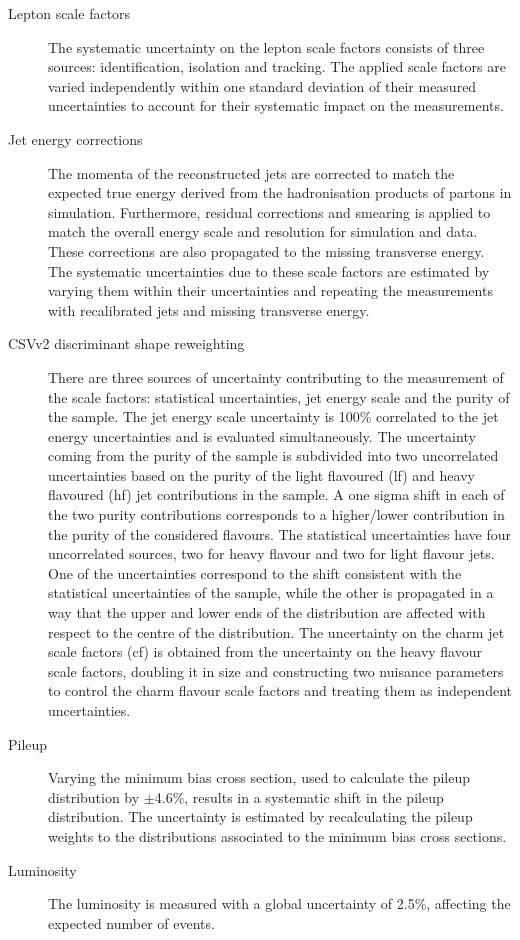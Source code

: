 \begin{description}
  		\item[Lepton scale factors] The systematic uncertainty on the lepton scale factors consists of three sources: identification, isolation and tracking.	The applied scale factors are varied independently within one standard deviation of their measured uncertainties to account for their systematic impact on the measurements. 

	\item[Jet energy corrections] The momenta of the reconstructed jets are corrected to match the expected true energy derived from the hadronisation products of partons in simulation. Furthermore, residual corrections and smearing is applied to match the overall energy scale and resolution for simulation and data. These corrections are also propagated to the missing transverse energy. The systematic uncertainties due to these scale factors are estimated by varying them within their uncertainties and repeating the measurements with recalibrated jets and missing transverse energy. 
	

	
	\item[CSVv2 discriminant shape reweighting] There are three sources of uncertainty contributing to the measurement of the scale factors: statistical uncertainties, jet energy scale and the purity of the sample. The jet energy scale uncertainty is 100\% correlated to the jet energy uncertainties and is evaluated simultaneously. The uncertainty coming from the purity of the sample is subdivided into two uncorrelated uncertainties based on the purity of the light flavoured (lf) and heavy flavoured (hf) jet contributions in the sample. A one sigma shift in each of the two purity contributions corresponds to a higher/lower contribution in the purity of the considered flavours. The statistical uncertainties have four uncorrelated sources, two for heavy flavour and two for light flavour jets. One of the uncertainties correspond to the shift consistent with the statistical uncertainties of the sample, while the other is propagated in a way that the upper and lower ends of the distribution are affected with respect to the centre of the distribution.   The uncertainty on the charm jet scale factors (cf)   is obtained from the uncertainty on the heavy flavour scale factors, doubling it in size and constructing two nuisance parameters to control the charm flavour scale factors and treating them as independent uncertainties. 
	
	
		\item[Pileup] Varying the minimum bias cross section, used to calculate the pileup distribution by $\pm$4.6\%, results in a systematic shift in the pileup distribution. The uncertainty is estimated by recalculating the pileup weights to the distributions associated to the minimum bias cross sections. 
		
		
		\item[Luminosity] The luminosity  is measured with a global uncertainty of 2.5\%, affecting the expected number of events. 
	
\end{description}

